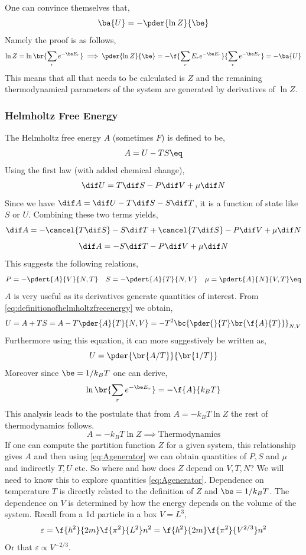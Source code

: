\documentclass{article}
\begin{document}
One can convince themselves that,
\[ \ba{U} = -\pder{\ln Z}{\be} \]
Namely the proof is as follows,
\[ \ln Z = \ln\br{\sum_r e^{-\be E_r}} \implies \pder{\ln Z}{\be} = -\f{\sum_r E_r e^{-\be E_r}}{\sum_r e^{-\be E_r}} = -\ba{U} \]
This means that all that needs to be calculated is $Z$ and the remaining thermodynamical parameters of the system are generated by derivatives of $\ln Z$.

\subsubsection{Helmholtz Free Energy}

The Helmholtz free energy $A$ (sometimes $F$) is defined to be,
\[ A = U - TS \eq \label{eq:definitionofhelmholtzfreeenergy}\]
Using the first law (with added chemical change),
\[ \dif U = T \dif S - P \dif V + \mu \dif N \]
Since we have $\dif A = \dif U - T \dif S - S \dif T$, it is a function of state like $S$ or $U$. Combining these two terms yields,
\[ \dif A = - \cancel{T \dif S} - S \dif T + \cancel{T \dif S} - P \dif V + \mu \dif N\]
\[ \dif A = - S \dif T - P \dif V + \mu \dif N\]
This suggests the following relations,
\[ P = -\pdert{A}{V}{N,T} \quad S = -\pdert{A}{T}{N,V} \quad \mu = \pdert{A}{N}{V,T} \eq \label{eq:Agenerator} \]
$A$ is very useful as its derivatives generate quantities of interest. From \eqref{eq:definitionofhelmholtzfreeenergy} we obtain,
\[ U = A + TS = A - T \pder{A}{T}{N,V} = - T^2 \bc{\pder{}{T} \br{\f{A}{T}}}_{N,V} \]
Furthermore using this equation, it can more suggestively be written as,
\[ U = \pder{\br{A/T}}{\br{1/T}} \]
Moreover since $\be = 1/ k_B T$ one can derive,
\[ \ln \br{\sum_r e^{-\be E_r}} = - \f{A}{k_B T} \]
This analysis leads to the postulate that from $A = - k_B T \ln Z$ the rest of thermodynamics follows.
\[ A = - k_B T \ln Z \implies \text{Thermodynamics} \]
If one can compute the partition function $Z$ for a given system, this relationship gives $A$ and then using \eqref{eq:Agenerator} we can obtain quantities of $P, S$ and $\mu$ and indirectly $T, U$ etc.
So where and how does $Z$ depend on $V,T,N$? We will need to know this to explore quantities \eqref{eq:Agenerator}. Dependence on temperature $T$ is directly related to the definition of $Z$ and $\be = 1/ k_B T$. The dependence on $V$ is determined by how the energy depends on the volume of the system. Recall from a 1d particle in a box $V = L^3$,
\[ \varepsilon = \f{\hbar^2}{2 m} \f{\pi^2}{L^2} n^2 = \f{\hbar^2}{2 m} \f{\pi^2}{V^{2/3}} n^2 \]
Or that $\varepsilon \propto V^{-2/3}$.
\end{document}
